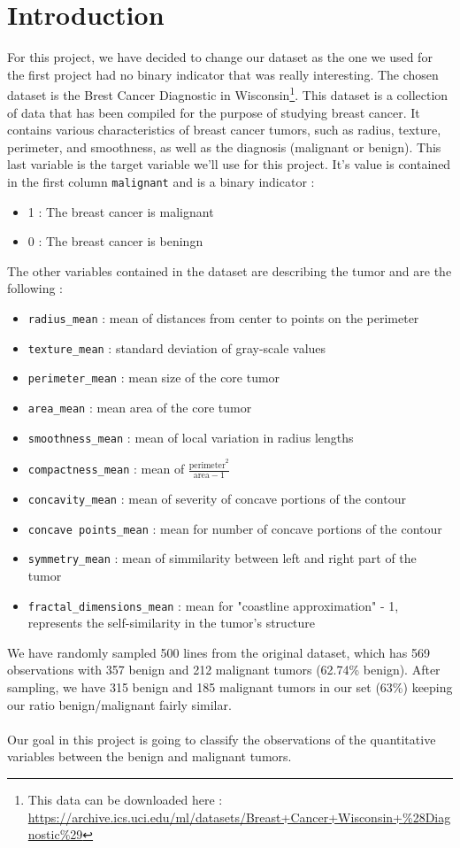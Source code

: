 \section{Introduction}
For this project, we have decided to change our dataset as the one we used for the first project had no binary indicator that was really interesting. The chosen dataset is the Brest Cancer Diagnostic in Wisconsin\footnote{This data can be downloaded here : \href{https://archive.ics.uci.edu/ml/datasets/Breast+Cancer+Wisconsin+\%28Diagnostic\%29}{https://archive.ics.uci.edu/ml/datasets/Breast+Cancer+Wisconsin+\%28Diagnostic\%29}}. This dataset is a collection of data that has been compiled for the purpose of studying breast cancer. It contains various characteristics of breast cancer tumors, such as radius, texture, perimeter, and smoothness, as well as the diagnosis (malignant or benign). This last variable is the target variable we'll use for this project. It's value is contained in the first column \verb|malignant| and is a binary indicator :
\begin{itemize}
    \item 1 : The breast cancer is malignant
    \item 0 : The breast cancer is beningn
\end{itemize}
The other variables contained in the dataset are describing the tumor and are the following :
\begin{itemize}
    \item \verb|radius_mean| : mean of distances from center to points on the perimeter
    \item \verb|texture_mean| : standard deviation of gray-scale values
    \item \verb|perimeter_mean| : mean size of the core tumor
    \item \verb|area_mean| : mean area of the core tumor
    \item \verb|smoothness_mean| : mean of local variation in radius lengths
    \item \verb|compactness_mean| : mean of $\frac{\text{perimeter}^2}{\text{area} - 1}$
    \item \verb|concavity_mean| : mean of severity of concave portions of the contour
    \item \verb|concave points_mean| : mean for number of concave portions of the contour
    \item \verb|symmetry_mean| : mean of simmilarity between left and right part of the tumor
    \item \verb|fractal_dimensions_mean| : mean for "coastline approximation" - 1, represents the self-similarity in the tumor's structure
\end{itemize}

We have randomly sampled 500 lines from the original dataset, which has 569 observations with 357 benign and 212 malignant tumors (62.74\% benign). After sampling, we have 315 benign and 185 malignant tumors in our set (63\%) keeping our ratio benign/malignant fairly similar. 
\\\\
Our goal in this project is going to classify the observations of the quantitative variables between the benign and malignant tumors.